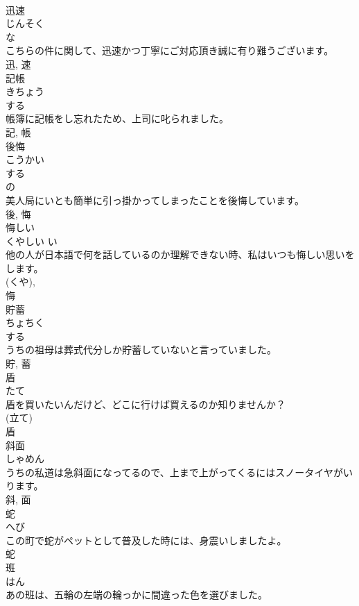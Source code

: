 \documentclass[8pt]{extreport}
\begin{document}
\begin{CJK}{UTF8}{min}
\\	迅速	
\\	じんそく	
\\	な 
\\	こちらの件に関して、迅速かつ丁寧にご対応頂き誠に有り難うございます。	
\\	迅, 速	
\\	記帳	
\\	きちょう	
\\	する 
\\	帳簿に記帳をし忘れたため、上司に叱られました。	
\\	記, 帳	
\\	後悔	
\\	こうかい	
\\	する 
\\	の 
\\	美人局にいとも簡単に引っ掛かってしまったことを後悔しています。	
\\	後, 悔	
\\	悔しい	
\\	くやしい	い 
\\	他の人が日本語で何を話しているのか理解できない時、私はいつも悔しい思いをします。	
\\	(くや), 
\\	悔	
\\	貯蓄	
\\	ちょちく	
\\	する 
\\	うちの祖母は葬式代分しか貯蓄していないと言っていました。	
\\	貯, 蓄	
\\	盾	
\\	たて	
\\	盾を買いたいんだけど、どこに行けば買えるのか知りませんか？	
\\	(立て) 
\\	盾	
\\	斜面	
\\	しゃめん	
\\	うちの私道は急斜面になってるので、上まで上がってくるにはスノータイヤがいります。	
\\	斜, 面	
\\	蛇	
\\	へび	
\\	この町で蛇がペットとして普及した時には、身震いしましたよ。	
\\	蛇	
\\	班	
\\	はん	
\\	あの班は、五輪の左端の輪っかに間違った色を選びました。	

\end{CJK}
\end{document}
